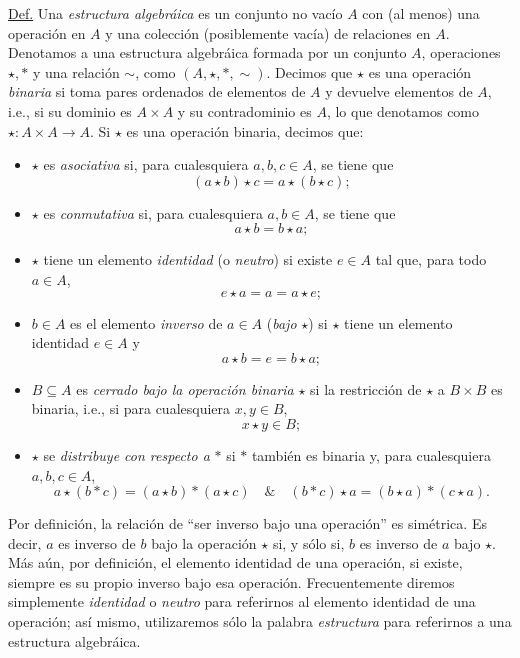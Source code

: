 \documentclass[apuntes]{subfiles}
\begin{document}
\begin{tcolorbox}[breakable]
    \underline{Def.} Una \emph{estructura algebráica} es un conjunto no vacío $A$ con (al menos) una operación en $A$ y una colección (posiblemente vacía) de relaciones en $A$. Denotamos a una estructura algebráica formada por un conjunto $A$, operaciones $\star,\ast$ y una relación $\sim$, como $(A,\star,\ast,\sim)$. Decimos que $\star$ es una operación \emph{binaria} si toma pares ordenados de elementos de $A$ y devuelve elementos de $A$, i.e., si su dominio es $A\times A$ y su contradominio es $A$, lo que denotamos como $\star:A\times A\to A$. Si $\star$ es una operación binaria, decimos que:

    \begin{itemize}
        \item $\star$ es \emph{asociativa} si, para cualesquiera $a,b,c\in A$, se tiene que $$(a\star b)\star c = a\star(b\star c);$$

        \item $\star$ es \emph{conmutativa} si, para cualesquiera $a,b\in A$, se tiene que $$a\star b = b\star a;$$

        \item $\star$ tiene un elemento \emph{identidad} (o \emph{neutro}) si existe $e\in A$ tal que, para todo $a\in A$, $$e\star a = a = a\star e;$$

        \item $b\in A$ es el elemento \emph{inverso} de $a\in A$ (\emph{bajo} $\star$) si $\star$ tiene un elemento identidad $e\in A$ y $$a\star b = e = b\star a;$$

        \item $B\subseteq A$ es \emph{cerrado bajo la operación binaria} $\star$ si la restricción de $\star$ a $B\times B$ es binaria, i.e., si para cualesquiera $x,y\in B$, $$x\star y\in B;$$

        \item $\star$ se \emph{distribuye con respecto a} $\ast$ si $\ast$ también es binaria y, para cualesquiera $a,b,c\in A$, $$a\star(b\ast c) = (a\star b)\ast(a\star c) \quad \& \quad (b\ast c)\star a = (b\star a)\ast(c\star a).$$
    \end{itemize}
\end{tcolorbox}
    
\begin{Obs}\label{obs:1.1}
    
Por definición, la relación de ``ser inverso bajo una operación'' es simétrica. Es decir, $a$ es inverso de $b$ bajo la operación $\star$ si, y sólo si, $b$ es inverso de $a$ bajo $\star$. Más aún, por definición, el elemento identidad de una operación, si existe, siempre es su propio inverso bajo esa operación. Frecuentemente diremos simplemente \emph{identidad} o \emph{neutro} para referirnos al elemento identidad de una operación; así mismo, utilizaremos sólo la palabra \emph{estructura} para referirnos a una estructura algebráica. 
\end{Obs}
\end{document}
